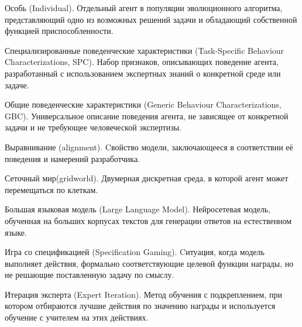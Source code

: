 \begin{definition}
    \label{def:individual}
    Особь (Individual). Отдельный агент в популяции эволюционного алгоритма, представляющий одно из возможных решений задачи и обладающий собственной функцией приспособленности.
\end{definition}

\begin{definition}
    \label{def:task_specific_bc}
    Специализированные поведенческие характеристики (Task-Specific Behaviour Characterizations, SPC). Набор признаков, описывающих поведение агента, разработанный с использованием экспертных знаний о конкретной среде или задаче.
\end{definition}

\begin{definition}
    \label{def:generic_bc}
    Общие поведенческие характеристики (Generic Behaviour Characterizations, GBC). Универсальное описание поведения агента, не зависящее от конкретной задачи и не требующее человеческой экспертизы.
\end{definition}


\begin{definition}
    \label{def:alignment}
    Выравнивание (alignment). Cвойство модели, заключающееся в соответствии её поведения и намерений разработчика. 
\end{definition}


\begin{definition}
    \label{def:gridworld}
    Сеточный мир(gridworld). Двумерная дискретная среда, в которой агент может перемещаться по клеткам.
\end{definition}

\begin{definition}
    \label{def:llm}
    Большая языковая модель (Large Language Model). Нейросетевая модель, обученная на больших корпусах текстов для генерации ответов на естественном языке.
\end{definition}

\begin{definition}
    \label{def:spec_game}
    Игра со спецификацией (Specification Gaming). Cитуация, когда модель выполняет действия, формально соответствующие целевой функции награды, но не решающие поставленную задачу по смыслу. 
\end{definition}

\begin{definition}
    \label{def:exp_iter}
    Итерация эксперта (Expert Iteration). Метод обучения с подкреплением, при котором отбираются лучшие действия по значению награды и используется обучение с учителем на этих действиях.
\end{definition}

